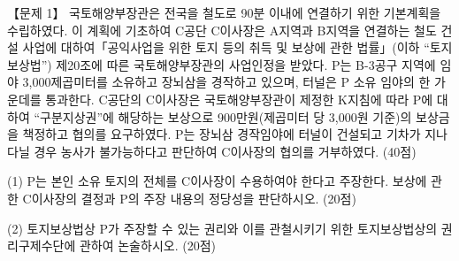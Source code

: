 \begin{longquestion}{【문제 1】}
국토해양부장관은 전국을 철도로 90분 이내에 연결하기 위한 기본계획을 수립하였다. 이 계획에 기초하여 C공단 C이사장은 A지역과 B지역을 연결하는 철도 건설 사업에 대하여「공익사업을 위한 토지 등의 취득 및 보상에 관한 법률」(이하 “토지보상법”) 제20조에 따른 국토해양부장관의 사업인정을 받았다. P는 B-3공구 지역에 임야 3,000제곱미터를 소유하고 장뇌삼을 경작하고 있으며, 터널은 P 소유 임야의 한 가운데를 통과한다. C공단의 C이사장은 국토해양부장관이 제정한 K지침에 따라 P에 대하여 “구분지상권”에 해당하는 보상으로 900만원(제곱미터 당 3,000원 기준)의 보상금을 책정하고 협의를 요구하였다. P는 장뇌삼 경작임야에 터널이 건설되고 기차가 지나다닐 경우 농사가 불가능하다고 판단하여 C이사장의 협의를 거부하였다. (40점) \par
\medskip\noindent (1) P는 본인 소유 토지의 전체를 C이사장이 수용하여야 한다고 주장한다. 보상에 관한 C이사장의 결정과 P의 주장 내용의 정당성을 판단하시오. (20점) \par
\medskip\noindent (2) 토지보상법상 P가 주장할 수 있는 권리와 이를 관철시키기 위한 토지보상법상의 권리구제수단에 관하여 논술하시오. (20점) \par
\end{longquestion}
